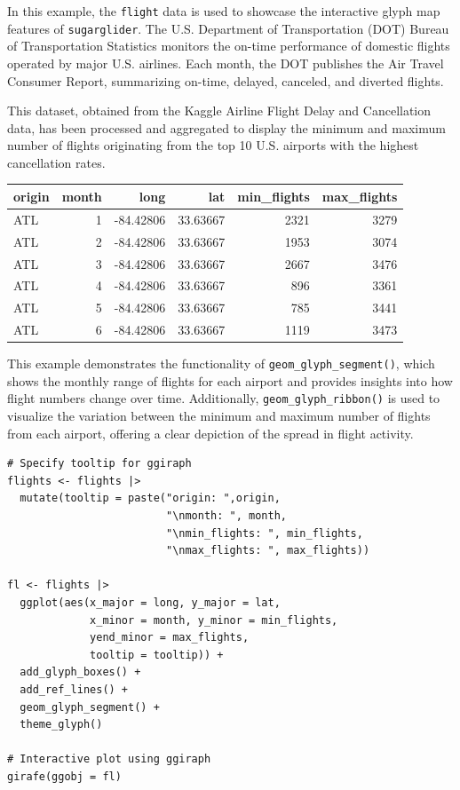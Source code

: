 In this example, the \texttt{flight} data is used to showcase the interactive glyph map features of \texttt{sugarglider}. The U.S. Department of Transportation (DOT) Bureau of Transportation Statistics monitors the on-time performance of domestic flights operated by major U.S. airlines. Each month, the DOT publishes the Air Travel Consumer Report, summarizing on-time, delayed, canceled, and diverted flights.

This dataset, obtained from the Kaggle Airline Flight Delay and Cancellation data, has been processed and aggregated to display the minimum and maximum number of flights originating from the top 10 U.S. airports with the highest cancellation rates.

\begin{table}
\centering
\begin{tabular}{l|r|r|r|r|r}
\hline
origin & month & long & lat & min\_flights & max\_flights\\
\hline
ATL & 1 & -84.42806 & 33.63667 & 2321 & 3279\\
\hline
ATL & 2 & -84.42806 & 33.63667 & 1953 & 3074\\
\hline
ATL & 3 & -84.42806 & 33.63667 & 2667 & 3476\\
\hline
ATL & 4 & -84.42806 & 33.63667 & 896 & 3361\\
\hline
ATL & 5 & -84.42806 & 33.63667 & 785 & 3441\\
\hline
ATL & 6 & -84.42806 & 33.63667 & 1119 & 3473\\
\hline
\end{tabular}
\end{table}

This example demonstrates the functionality of \texttt{geom\_glyph\_segment()}, which shows the monthly range of flights for each airport and provides insights into how flight numbers change over time. Additionally, \texttt{geom\_glyph\_ribbon()} is used to visualize the variation between the minimum and maximum number of flights from each airport, offering a clear depiction of the spread in flight activity.

\begin{verbatim}
# Specify tooltip for ggiraph 
flights <- flights |>
  mutate(tooltip = paste("origin: ",origin,
                         "\nmonth: ", month,
                         "\nmin_flights: ", min_flights,
                         "\nmax_flights: ", max_flights))

fl <- flights |> 
  ggplot(aes(x_major = long, y_major = lat,
             x_minor = month, y_minor = min_flights,
             yend_minor = max_flights,
             tooltip = tooltip)) + 
  add_glyph_boxes() +
  add_ref_lines() +
  geom_glyph_segment() +
  theme_glyph()

# Interactive plot using ggiraph
girafe(ggobj = fl)
\end{verbatim}

